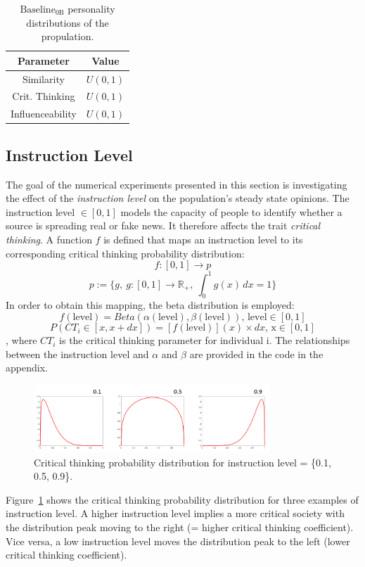 \begin{table}[h!]
\centering
	\begin{tabular}{||c | c||}
	\hline
	Parameter&Value\\
	\hline
	Similarity&$U(0,1)$\\
	Crit. Thinking&$U(0,1)$\\
	Influenceability&$U(0,1)$\\
	\hline
	\end{tabular}
	\newline
	\caption{$\text{Baseline}_\text{0B}$ personality distributions of the propulation.}
	\label{table:2}
\end{table}
\subsection{Instruction Level}
The goal of the numerical experiments presented in this section is investigating the effect of the \emph{instruction level} on the population's steady state opinions. The instruction level $\in [0,1]$ models the capacity of people to identify whether a source is spreading real or fake news. It therefore affects the trait \emph{critical thinking}. A function $f$ is defined that maps an instruction level to its corresponding critical thinking probability distribution:
$$
f: [0,1] \to p 
$$
$$
p:= \{g,\ g: [0,1] \to \mathbb{R}_+,\ \int_{0}^{1} g(x) \,dx = 1\}
$$
In order to obtain this mapping, the beta distribution is employed: 
$$
f(\text{level}) = Beta(\alpha(\text{level}), \beta(\text{level}))\text{, level} \in [0,1]
$$
$$
P(CT_i\in[x,x+dx]) = [f(\text{level})](x)\times dx\text{, x}\in [0,1]
$$
, where $CT_i$ is the critical thinking parameter for individual i. The relationships between the instruction level and $\alpha$ and $\beta$ are provided in the code in the appendix. 
\begin{figure}[!t]
	\centering
	\includegraphics[width=3.5in]{Figures/instruction_level_dist.png}
	\caption{Critical thinking probability distribution for instruction level = \{0.1, 0.5, 0.9\}.}
	\label{pics:critdistribution}
\end{figure}
Figure~\ref{pics:critdistribution} shows the critical thinking probability distribution for three examples of instruction level. A higher instruction level implies a more critical society with the distribution peak moving to the right (= higher critical thinking coefficient). Vice versa, a low instruction level moves the distribution peak to the left (lower critical thinking coefficient). \newline
